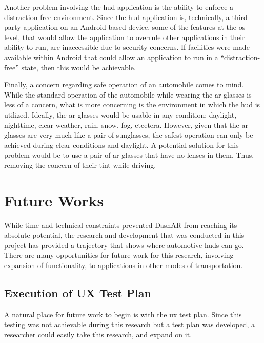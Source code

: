         \par Another problem involving the \gls{hud} application is the ability to enforce a distraction-free environment. Since the \gls{hud} application is, technically, a third-party application on an Android-based device, some of the features at the \gls{os} level, that would allow the application to overrule other applications in their ability to run, are inaccessible due to security concerns. If facilities were made available within Android that could allow an application to run in a ``distraction-free'' state, then this would be achievable.

        \par Finally, a concern regarding safe operation of an automobile comes to mind. While the standard operation of the automobile while wearing the \gls{ar} glasses is less of a concern, what is more concerning is the environment in which the \gls{hud} is utilized. Ideally, the \gls{ar} glasses would be usable in any condition: daylight, nighttime, clear weather, rain, snow, fog, etcetera. However, given that the \gls{ar} glasses are very much like a pair of sunglasses, the safest operation can only be achieved during clear conditions and daylight. A potential solution for this problem would be to use a pair of \gls{ar} glasses that have no lenses in them. Thus, removing the concern of their tint while driving.

\section{Future Works}
    \par While time and technical constraints prevented DashAR from reaching its absolute potential, the research and development that was conducted in this project has provided a trajectory that shows where automotive \glspl{hud} can go. There are many opportunities for future work for this research, involving expansion of functionality, to applications in other modes of transportation.

    \subsection{Execution of UX Test Plan}
        \par A natural place for future work to begin is with the \gls{ux} test plan. Since this testing was not achievable during this research but a test plan was developed, a researcher could easily take this research, and expand on it.

